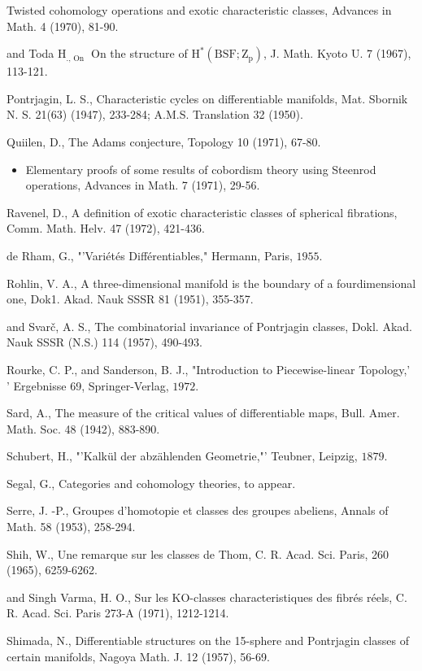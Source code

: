 \documentclass[10pt]{article}
\begin{document}
Twisted cohomology operations and exotic characteristic classes, Advances in Math. 4 (1970), 81-90.

and Toda $\mathrm{H}_{\text {., On }}$ On the structure of $\mathrm{H}^{*}\left(\mathrm{BSF} ; \mathrm{Z}_{\mathrm{p}}\right)$, J. Math. Kyoto U. 7 (1967), 113-121.

Pontrjagin, L. S., Characteristic cycles on differentiable manifolds, Mat. Sbornik N. S. 21(63) (1947), 233-284; A.M.S. Translation 32 (1950).

Quiilen, D., The Adams conjecture, Topology 10 (1971), 67-80.

\begin{itemize}
  \item Elementary proofs of some results of cobordism theory using Steenrod operations, Advances in Math. 7 (1971), 29-56.
\end{itemize}
Ravenel, D., A definition of exotic characteristic classes of spherical fibrations, Comm. Math. Helv. 47 (1972), 421-436.

de Rham, G., "'Variétés Différentiables," Hermann, Paris, $1955 .$

Rohlin, V. A., A three-dimensional manifold is the boundary of a fourdimensional one, Dok1. Akad. Nauk SSSR 81 (1951), 355-357.

and Svarč, A. S., The combinatorial invariance of Pontrjagin classes, Dokl. Akad. Nauk SSSR (N.S.) 114 (1957), 490-493.

Rourke, C. P., and Sanderson, B. J., "Introduction to Piecewise-linear Topology,' ' Ergebnisse 69, Springer-Verlag, $1972 .$

Sard, A., The measure of the critical values of differentiable maps, Bull. Amer. Math. Soc. 48 (1942), 883-890.

Schubert, H., "'Kalkül der abzählenden Geometrie,"' Teubner, Leipzig, $1879 .$

Segal, G., Categories and cohomology theories, to appear.

Serre, J. -P., Groupes d'homotopie et classes des groupes abeliens, Annals of Math. 58 (1953), 258-294.

Shih, W., Une remarque sur les classes de Thom, C. R. Acad. Sci. Paris, 260 (1965), 6259-6262.

and Singh Varma, H. O., Sur les KO-classes characteristiques des fibrés réels, C. R. Acad. Sci. Paris 273-A (1971), 1212-1214.

Shimada, N., Differentiable structures on the 15-sphere and Pontrjagin classes of certain manifolds, Nagoya Math. J. 12 (1957), 56-69.
\end{document}
